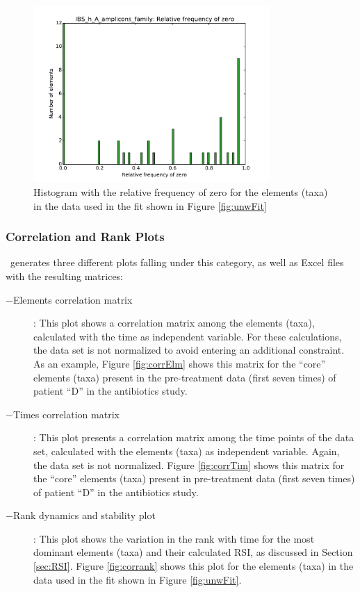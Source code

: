 \begin{figure}
	\centering
	\includegraphics[width=0.8\textwidth]{results/hist/IBS_h_A_amplicons_family_ZRFhist.pdf}
	\caption{Histogram with the relative frequency of zero for the elements (taxa) in the data used in the fit shown in Figure \ref{fig:unwFit}}
	\label{fig:histZRF}
\end{figure}

\subsubsection*{Correlation and Rank Plots} 
\CC\ generates three different plots falling under this category, as well as Excel files with the resulting matrices:
\begin{description}
	\item[$-$Elements correlation matrix]: This plot shows a correlation matrix among the elements (taxa), calculated with the time as independent variable. For these calculations, the data set is not normalized to avoid entering an additional constraint. As an example, Figure \ref{fig:corrElm} shows this matrix for the ``core'' elements (taxa) present in the pre-treatment data (first seven times) of patient ``D'' in the antibiotics study\cite{antibiotic}. 
	\item[$-$Times correlation matrix]: This plot presents a correlation matrix among the time points of the data set, calculated with the elements (taxa) as independent variable. Again, the data set is not normalized. Figure \ref{fig:corrTim} shows this matrix for the ``core'' elements (taxa) present in pre-treatment data (first seven times) of patient ``D'' in the antibiotics study\cite{antibiotic}. 
	\item[$-$Rank dynamics and stability plot]: This plot shows the variation in the rank with time for the most dominant elements (taxa) and their calculated RSI, as discussed in Section \ref{sec:RSI}. Figure \ref{fig:corrank} shows this plot for the elements (taxa) in the data used in the fit shown in Figure \ref{fig:unwFit}.
\end{description}

